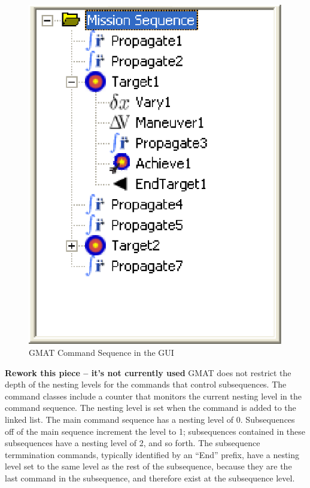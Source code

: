 \begin{figure}[htb]
\begin{center}
\includegraphics[scale=0.5]{Images/HierarchicalMissionTree.eps}
\caption{\label{figure:HierarchicalMissionTree}GMAT Command Sequence in the GUI}
\end{center}
\end{figure}

\textbf{Rework this piece -- it's not currently used} GMAT does not restrict the depth of the
nesting levels for the commands that control subsequences. The command classes include a counter
that monitors the current nesting level in the command sequence.  The nesting level is set when the
command is added to the linked list.  The main command sequence has a nesting level of 0.
Subsequences off of the main sequence increment the level to 1; subsequences contained in these
subsequences have a nesting level of 2, and so forth.  The subsequence termmination commands,
typically identified by an ``End'' prefix, have a nesting level set to the same level as the rest of
the subsequence, because they are the last command in the subsequence, and therefore exist at the
subsequence level.

